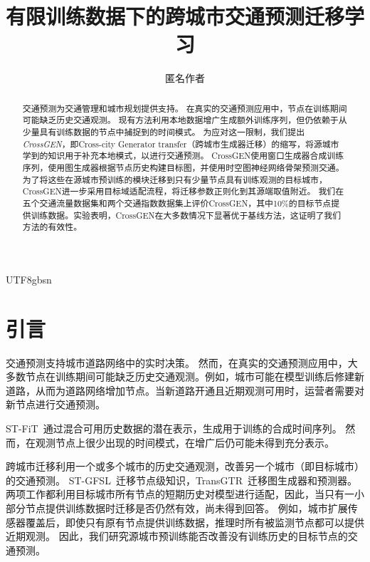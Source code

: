 \documentclass[runningheads,a4paper]{llncs}
\title{有限训练数据下的跨城市交通预测迁移学习}
\author{匿名作者}
\institute{}
\begin{document}
\ifPDFTeX\begin{CJK*}{UTF8}{gbsn}\fi
\maketitle

\begin{abstract}

交通预测为交通管理和城市规划提供支持。
在真实的交通预测应用中，节点在训练期间可能缺乏历史交通观测。
现有方法利用本地数据增广生成额外训练序列，但仍依赖于从少量具有训练数据的节点中捕捉到的时间模式。
为应对这一限制，我们提出\emph{CrossGEN}，即Cross-city Generator transfer（跨城市生成器迁移）的缩写，将源城市学到的知识用于补充本地模式，以进行交通预测。
CrossGEN使用窗口生成器合成训练序列，使用图生成器根据节点历史构建目标图，并使用时空图神经网络骨架预测交通。
为了将这些在源城市预训练的模块迁移到只有少量节点具有训练观测的目标城市，CrossGEN进一步采用目标域适配流程，将迁移参数正则化到其源端取值附近。
我们在五个交通流量数据集和两个交通指数数据集上评价CrossGEN，其中10\%的目标节点提供训练数据。实验表明，CrossGEN在大多数情况下显著优于基线方法，这证明了我们方法的有效性。


\end{abstract}

\section{引言}
交通预测支持城市道路网络中的实时决策。
然而，在真实的交通预测应用中，大多数节点在训练期间可能缺乏历史交通观测。例如，城市可能在模型训练后修建新道路，从而为道路网络增加节点。当新道路开通且近期观测可用时，运营者需要对新节点进行交通预测。

ST-FiT~\cite{stfit}通过混合可用历史数据的潜在表示，生成用于训练的合成时间序列。
然而，在观测节点上很少出现的时间模式，在增广后仍可能未得到充分表示。

跨城市迁移利用一个或多个城市的历史交通观测，改善另一个城市（即目标城市）的交通预测。
ST-GFSL~\cite{stgfsl}迁移节点级知识，TransGTR~\cite{transgtr}迁移图生成器和预测器。
两项工作都利用目标城市所有节点的短期历史对模型进行适配，因此，当只有一小部分节点提供训练数据时迁移是否仍然有效，尚未得到回答。
例如，城市扩展传感器覆盖后，即使只有原有节点提供训练数据，推理时所有被监测节点都可以提供近期观测。
因此，我们研究源城市预训练能否改善没有训练历史的目标节点的交通预测。


\end{CJK*}
\end{document}
